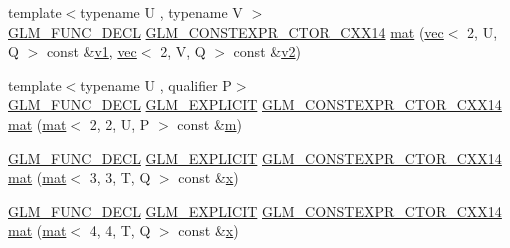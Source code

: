 \begin{DoxyCompactItemize}
\item 
{\footnotesize template$<$typename U , typename V $>$ }\\\mbox{\hyperlink{setup_8hpp_ab2d052de21a70539923e9bcbf6e83a51}{G\+L\+M\+\_\+\+F\+U\+N\+C\+\_\+\+D\+E\+CL}} \mbox{\hyperlink{setup_8hpp_a0900f9145e68bf6061b6f5e7be3fa751}{G\+L\+M\+\_\+\+C\+O\+N\+S\+T\+E\+X\+P\+R\+\_\+\+C\+T\+O\+R\+\_\+\+C\+X\+X14}} \mbox{\hyperlink{structglm_1_1mat_3_012_00_012_00_01_t_00_01_q_01_4_a5bae47b291567292c6931d1fa10b5798}{mat}} (\mbox{\hyperlink{structglm_1_1vec}{vec}}$<$ 2, U, Q $>$ const \&\mbox{\hyperlink{_s_d_l__opengl__glext_8h_a435c176a02c061b43e19bdf7c86cceae}{v1}}, \mbox{\hyperlink{structglm_1_1vec}{vec}}$<$ 2, V, Q $>$ const \&\mbox{\hyperlink{_s_d_l__opengl__glext_8h_a0928f6d0f0f794ba000a21dfae422136}{v2}})
\item 
{\footnotesize template$<$typename U , qualifier P$>$ }\\\mbox{\hyperlink{setup_8hpp_ab2d052de21a70539923e9bcbf6e83a51}{G\+L\+M\+\_\+\+F\+U\+N\+C\+\_\+\+D\+E\+CL}} \mbox{\hyperlink{setup_8hpp_a6c74f5a5e7b134ab69023ff9a30d4d5d}{G\+L\+M\+\_\+\+E\+X\+P\+L\+I\+C\+IT}} \mbox{\hyperlink{setup_8hpp_a0900f9145e68bf6061b6f5e7be3fa751}{G\+L\+M\+\_\+\+C\+O\+N\+S\+T\+E\+X\+P\+R\+\_\+\+C\+T\+O\+R\+\_\+\+C\+X\+X14}} \mbox{\hyperlink{structglm_1_1mat_3_012_00_012_00_01_t_00_01_q_01_4_a5957fcd6239f1897d7538031ce3b2f0d}{mat}} (\mbox{\hyperlink{structglm_1_1mat}{mat}}$<$ 2, 2, U, P $>$ const \&\mbox{\hyperlink{_s_d_l__opengl__glext_8h_af593500c283bf1a787a6f947f503a5c2}{m}})
\item 
\mbox{\hyperlink{setup_8hpp_ab2d052de21a70539923e9bcbf6e83a51}{G\+L\+M\+\_\+\+F\+U\+N\+C\+\_\+\+D\+E\+CL}} \mbox{\hyperlink{setup_8hpp_a6c74f5a5e7b134ab69023ff9a30d4d5d}{G\+L\+M\+\_\+\+E\+X\+P\+L\+I\+C\+IT}} \mbox{\hyperlink{setup_8hpp_a0900f9145e68bf6061b6f5e7be3fa751}{G\+L\+M\+\_\+\+C\+O\+N\+S\+T\+E\+X\+P\+R\+\_\+\+C\+T\+O\+R\+\_\+\+C\+X\+X14}} \mbox{\hyperlink{structglm_1_1mat_3_012_00_012_00_01_t_00_01_q_01_4_a682cca2c732533360d904d912f4c69e8}{mat}} (\mbox{\hyperlink{structglm_1_1mat}{mat}}$<$ 3, 3, T, Q $>$ const \&\mbox{\hyperlink{_s_d_l__opengl_8h_ad0e63d0edcdbd3d79554076bf309fd47}{x}})
\item 
\mbox{\hyperlink{setup_8hpp_ab2d052de21a70539923e9bcbf6e83a51}{G\+L\+M\+\_\+\+F\+U\+N\+C\+\_\+\+D\+E\+CL}} \mbox{\hyperlink{setup_8hpp_a6c74f5a5e7b134ab69023ff9a30d4d5d}{G\+L\+M\+\_\+\+E\+X\+P\+L\+I\+C\+IT}} \mbox{\hyperlink{setup_8hpp_a0900f9145e68bf6061b6f5e7be3fa751}{G\+L\+M\+\_\+\+C\+O\+N\+S\+T\+E\+X\+P\+R\+\_\+\+C\+T\+O\+R\+\_\+\+C\+X\+X14}} \mbox{\hyperlink{structglm_1_1mat_3_012_00_012_00_01_t_00_01_q_01_4_a72c0e5e462b5dd23b122288114549fc8}{mat}} (\mbox{\hyperlink{structglm_1_1mat}{mat}}$<$ 4, 4, T, Q $>$ const \&\mbox{\hyperlink{_s_d_l__opengl_8h_ad0e63d0edcdbd3d79554076bf309fd47}{x}})

\end{DoxyCompactItemize}
